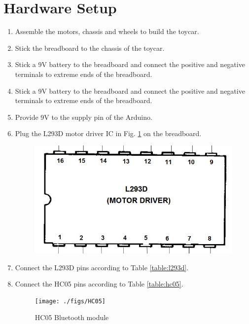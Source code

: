 \documentclass[journal,12pt,twocolumn]{IEEEtran}
\renewcommand\thesection{\arabic{section}}
\begin{document}
\section{Hardware Setup}
%
\begin{enumerate}[label=\thesection.\arabic*
,ref=\thesection.\theenumi]

\item Assemble the motors, chassis and wheels to build the toycar.
%
\item Stick the breadboard to the chassis of the toycar.
%
%

\item Stick a 9V battery to the breadboard and connect the positive and negative 
terminals to extreme ends of the breadboard.
%
\item 
Stick a 9V battery to the breadboard and connect the positive and negative terminals to extreme ends of the breadboard.
%
\item
Provide 9V to the supply pin of the Arduino.
%
\item
Plug the L293D motor driver IC in Fig. \ref{fig:l293d} on the breadboard.

\begin{figure}[!h]
\begin{center}
\includegraphics[width=\columnwidth]{./figs/l293d}
\end{center}
\caption{}
\label{fig:l293d}
\end{figure}
%
%
\item
Connect the L293D pins according to Table \ref{table:l293d}.

	
\item
Connect the HC05 pins according to Table \ref{table:hc05}.


\begin{figure}[ht!]
\begin{center}
\texttt{[image: ./figs/HC05]}
\end{center}
\caption{HC05 Bluetooth module}
\label{fig:hc05}
\end{figure}

	


\end{enumerate}
%
\end{document}
